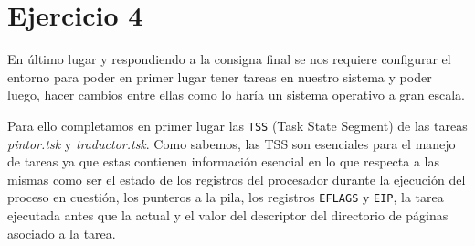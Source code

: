 \section{Ejercicio 4}

En último lugar y respondiendo a la consigna final se nos requiere configurar el entorno para poder en primer lugar tener tareas en nuestro sistema y poder luego, hacer cambios entre ellas como lo haría un sistema operativo a gran escala. %

Para ello completamos en primer lugar las \texttt{TSS} (Task State Segment) de las tareas \emph{pintor.tsk} y \emph{traductor.tsk}. Como sabemos, las TSS son esenciales para el manejo de tareas ya que estas contienen información esencial en lo que respecta a las mismas como ser el estado de los registros del procesador durante la ejecución del proceso en cuestión, los punteros a la pila, los registros \texttt{EFLAGS} y \texttt{EIP}, la tarea ejecutada antes que la actual y el valor del descriptor del directorio de páginas asociado a la tarea. 
